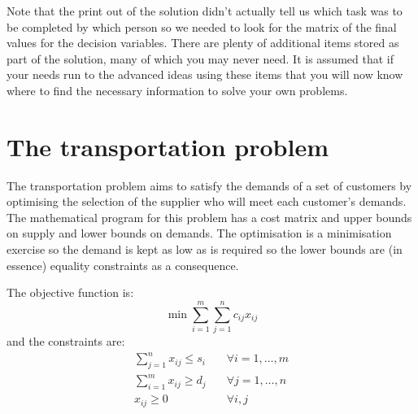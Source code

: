 Note that the print out of the solution didn't actually tell us which task was to be completed by which person so we needed to look for the matrix of the final values for the decision variables. There are plenty of additional items stored as part of the solution, many of which you may never need. It is assumed that if your needs run to the advanced ideas using these items that you will now know where to find the necessary information to solve your own problems.

\section{The transportation problem}

The transportation problem aims to satisfy the demands of a set of customers by optimising the selection of the supplier who will meet each customer's demands. The mathematical program for this problem has a cost matrix and upper bounds on supply and lower bounds on demands. The optimisation is a minimisation exercise so the demand is kept as low as is required so the lower bounds are (in essence) equality constraints as a consequence.

The objective function is:\begin{equation}\label{OperResTransObj}
\min{ \sum_{i=1}^m{ \sum_{j=1}^n{
c_{ij}x_{ij}
}}}\end{equation}
and the constraints are:
\begin{eqnarray*} \sum_{j=1}^n { x_{ij}} \le s_i& \quad \forall i=1,\ldots,m\\
\sum_{i=1}^m { x_{ij}} \ge d_j& \quad \forall j=1,\ldots,n\\
x_{ij} \ge 0& \quad \forall i,j\\
\end{eqnarray*} 

